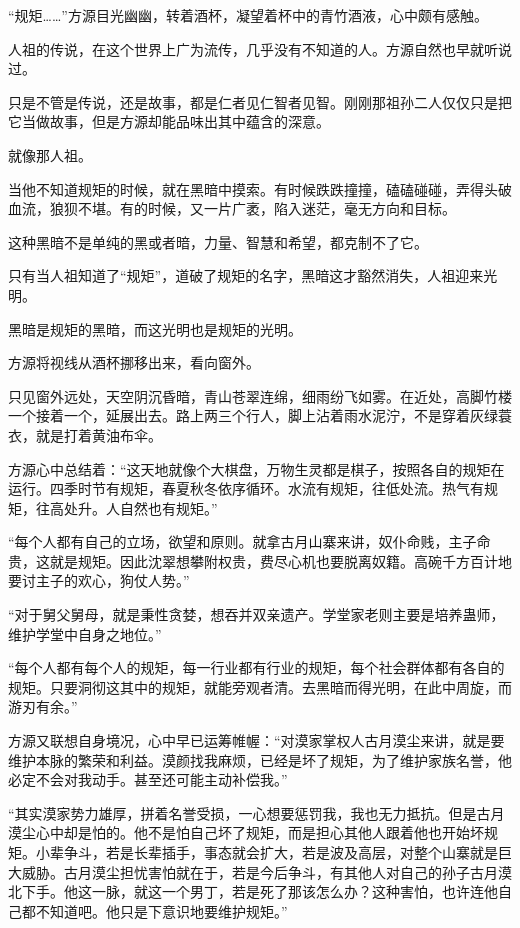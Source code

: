 \begin{this_body}
“规矩……”方源目光幽幽，转着酒杯，凝望着杯中的青竹酒液，心中颇有感触。

人祖的传说，在这个世界上广为流传，几乎没有不知道的人。方源自然也早就听说过。

只是不管是传说，还是故事，都是仁者见仁智者见智。刚刚那祖孙二人仅仅只是把它当做故事，但是方源却能品味出其中蕴含的深意。

就像那人祖。

当他不知道规矩的时候，就在黑暗中摸索。有时候跌跌撞撞，磕磕碰碰，弄得头破血流，狼狈不堪。有的时候，又一片广袤，陷入迷茫，毫无方向和目标。

这种黑暗不是单纯的黑或者暗，力量、智慧和希望，都克制不了它。

只有当人祖知道了“规矩”，道破了规矩的名字，黑暗这才豁然消失，人祖迎来光明。

黑暗是规矩的黑暗，而这光明也是规矩的光明。

方源将视线从酒杯挪移出来，看向窗外。

只见窗外远处，天空阴沉昏暗，青山苍翠连绵，细雨纷飞如雾。在近处，高脚竹楼一个接着一个，延展出去。路上两三个行人，脚上沾着雨水泥泞，不是穿着灰绿蓑衣，就是打着黄油布伞。

方源心中总结着：“这天地就像个大棋盘，万物生灵都是棋子，按照各自的规矩在运行。四季时节有规矩，春夏秋冬依序循环。水流有规矩，往低处流。热气有规矩，往高处升。人自然也有规矩。”

“每个人都有自己的立场，欲望和原则。就拿古月山寨来讲，奴仆命贱，主子命贵，这就是规矩。因此沈翠想攀附权贵，费尽心机也要脱离奴籍。高碗千方百计地要讨主子的欢心，狗仗人势。”

“对于舅父舅母，就是秉性贪婪，想吞并双亲遗产。学堂家老则主要是培养蛊师，维护学堂中自身之地位。”

“每个人都有每个人的规矩，每一行业都有行业的规矩，每个社会群体都有各自的规矩。只要洞彻这其中的规矩，就能旁观者清。去黑暗而得光明，在此中周旋，而游刃有余。”

方源又联想自身境况，心中早已运筹帷幄：“对漠家掌权人古月漠尘来讲，就是要维护本脉的繁荣和利益。漠颜找我麻烦，已经是坏了规矩，为了维护家族名誉，他必定不会对我动手。甚至还可能主动补偿我。”

“其实漠家势力雄厚，拼着名誉受损，一心想要惩罚我，我也无力抵抗。但是古月漠尘心中却是怕的。他不是怕自己坏了规矩，而是担心其他人跟着他也开始坏规矩。小辈争斗，若是长辈插手，事态就会扩大，若是波及高层，对整个山寨就是巨大威胁。古月漠尘担忧害怕就在于，若是今后争斗，有其他人对自己的孙子古月漠北下手。他这一脉，就这一个男丁，若是死了那该怎么办？这种害怕，也许连他自己都不知道吧。他只是下意识地要维护规矩。”


\end{this_body}
